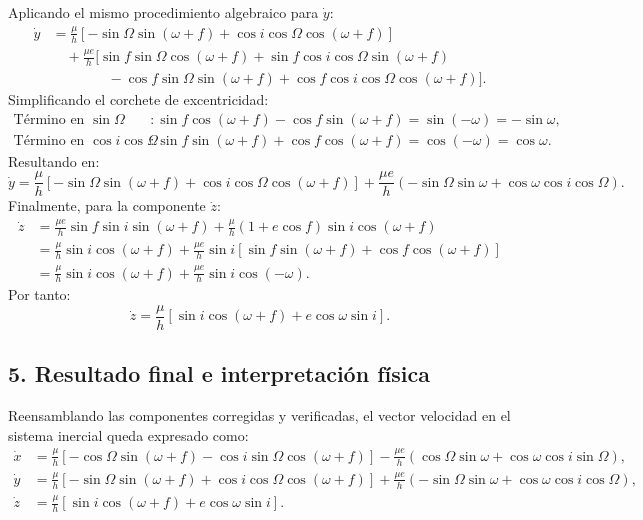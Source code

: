 \documentclass[12pt, a4paper]{article}
\begin{document}
Aplicando el mismo procedimiento algebraico para $\dot{y}$:
\begin{align*}
\dot{y} &= \frac{\mu}{h} \left[ -\sin\Omega \sin(\omega+f) + \cos i \cos\Omega \cos(\omega+f) \right] \\
&\quad + \frac{\mu e}{h} \Big[ \sin f \sin\Omega \cos(\omega+f) + \sin f \cos i \cos\Omega \sin(\omega+f) \\
&\quad\quad\quad\quad - \cos f \sin\Omega \sin(\omega+f) + \cos f \cos i \cos\Omega \cos(\omega+f) \Big].
\end{align*}
Simplificando el corchete de excentricidad:
\begin{align*}
\text{Término en } \sin\Omega &: \sin f \cos(\omega+f) - \cos f \sin(\omega+f) = \sin(-\omega) = -\sin\omega, \\
\text{Término en } \cos i \cos\Omega &: \sin f \sin(\omega+f) + \cos f \cos(\omega+f) = \cos(-\omega) = \cos\omega.
\end{align*}
Resultando en:
\begin{equation}
\dot{y} = \frac{\mu}{h} \left[ -\sin\Omega \sin(\omega+f) + \cos i \cos\Omega \cos(\omega+f) \right] + \frac{\mu e}{h} \left( -\sin\Omega \sin\omega + \cos\omega \cos i \cos\Omega \right).
\end{equation}
Finalmente, para la componente $\dot{z}$:
\begin{align*}
\dot{z} &= \frac{\mu e}{h} \sin f \sin i \sin(\omega+f) + \frac{\mu}{h}(1+e\cos f) \sin i \cos(\omega+f) \\
&= \frac{\mu}{h} \sin i \cos(\omega+f) + \frac{\mu e}{h} \sin i \left[ \sin f \sin(\omega+f) + \cos f \cos(\omega+f) \right] \\
&= \frac{\mu}{h} \sin i \cos(\omega+f) + \frac{\mu e}{h} \sin i \cos(-\omega).
\end{align*}
Por tanto:
\begin{equation}
\dot{z} = \frac{\mu}{h} \left[ \sin i \cos(\omega+f) + e \cos\omega \sin i \right].
\end{equation}

\subsection*{5. Resultado final e interpretación física}
Reensamblando las componentes corregidas y verificadas, el vector velocidad en el sistema inercial queda expresado como:
\begin{align*}
\dot{x} &= \frac{\mu}{h} \left[ -\cos\Omega \sin(\omega+f) - \cos i \sin\Omega \cos(\omega+f) \right] - \frac{\mu e}{h} \left( \cos\Omega \sin\omega + \cos\omega \cos i \sin\Omega \right), \\
\dot{y} &= \frac{\mu}{h} \left[ -\sin\Omega \sin(\omega+f) + \cos i \cos\Omega \cos(\omega+f) \right] + \frac{\mu e}{h} \left( -\sin\Omega \sin\omega + \cos\omega \cos i \cos\Omega \right), \\
\dot{z} &= \frac{\mu}{h} \left[ \sin i \cos(\omega+f) + e \cos\omega \sin i \right].
\end{align*}
\end{document}
